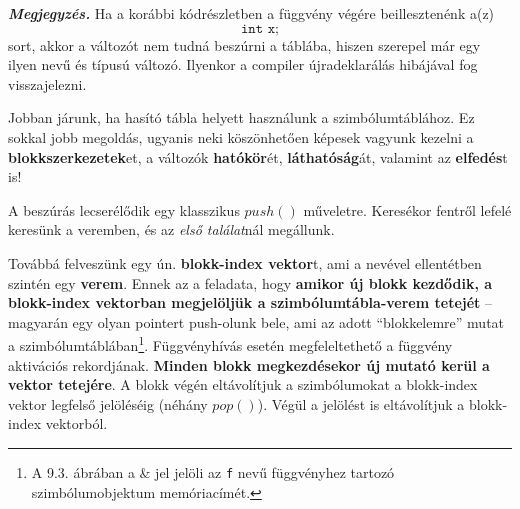 \textbf{\textit{Megjegyzés.}} Ha a korábbi kódrészletben a függvény végére beillesztenénk a(z)
\[\texttt{int x;}\] sort, akkor a változót nem tudná beszúrni a táblába, hiszen szerepel már egy ilyen nevű és típusú változó. Ilyenkor a compiler újradeklarálás hibájával fog visszajelezni. 

Jobban járunk, ha hasító tábla helyett  használunk a szimbólumtáblához. Ez sokkal jobb megoldás, ugyanis neki köszönhetően képesek vagyunk kezelni a \textbf{blokkszerkezetek}et, a változók \textbf{hatókör}ét, \textbf{láthatóság}át, valamint az \textbf{elfedés}t is!

A beszúrás lecserélődik egy klasszikus $push()$ műveletre.
Keresékor fentről lefelé keresünk a veremben, és az \textit{első találat}nál megállunk.

Továbbá felveszünk egy ún. \textbf{blokk-index vektor}t, ami a nevével ellentétben szintén egy \textbf{verem}. Ennek az a feladata, hogy \textbf{amikor új blokk kezdődik, a blokk-index vektorban megjelöljük a szimbólumtábla-verem tetejét} -- magyarán egy olyan pointert push-olunk bele, ami az adott ``blokkelemre'' mutat a szimbólumtáblában\footnote{A 9.3. ábrában a \& jel jelöli az \texttt{f} nevű függvényhez tartozó szimbólumobjektum memóriacímét.}. Függvényhívás esetén megfeleltethető a függvény aktivációs rekordjának. \textbf{Minden blokk megkezdésekor új mutató kerül a vektor tetejére}. A blokk végén eltávolítjuk a szimbólumokat a blokk-index vektor legfelső jelöléséig (néhány $pop()$). Végül a jelölést is eltávolítjuk a blokk-index vektorból.

